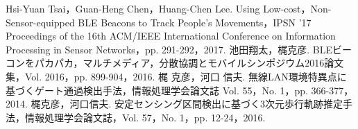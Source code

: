 \documentclass[Japanese]{dicomopapers}
\begin{document}
\begin{thebibliography}{20}
    Hsi-Yuan Tsai，Guan-Heng Chen，Huang-Chen Lee. Using Low-cost，Non-Sensor-equipped BLE Beacons to Track People's Movements，IPSN '17 Proceedings of the 16th ACM/IEEE International Conference on Information Processing in Sensor Networks，pp. 291-292，2017.
    池田翔太，梶克彦. BLEビーコンをパカパカ，マルチメディア，分散協調とモバイルシンポジウム2016論文集，Vol. 2016，pp. 899-904，2016.
    梶 克彦，河口 信夫. 無線LAN環境特異点に基づくゲート通過検出手法，情報処理学会論文誌 Vol. 55，No. 1，pp. 366-377，2014.
    梶克彦，河口信夫. 安定センシング区間検出に基づく3次元歩行軌跡推定手法，情報処理学会論文誌，Vol. 57，No. 1，pp. 12-24，2016.



\end{thebibliography}
\end{document}
